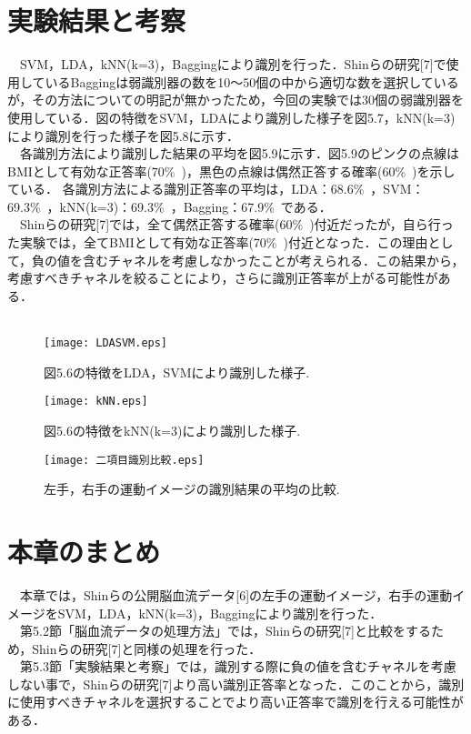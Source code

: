 \documentclass[a4j,12pt]{jreport}
\begin{document}
\section{実験結果と考察}
　SVM，LDA，kNN(k=3)，Baggingにより識別を行った．Shinらの研究[7]で使用しているBaggingは弱識別器の数を10～50個の中から適切な数を選択しているが，その方法についての明記が無かったため，今回の実験では30個の弱識別器を使用している．図の特徴をSVM，LDAにより識別した様子を図5.7，kNN(k=3)により識別を行った様子を図5.8に示す．\\
　各識別方法により識別した結果の平均を図5.9に示す．図5.9のピンクの点線はBMIとして有効な正答率(70\%\ )，黒色の点線は偶然正答する確率(60\%\ )を示している． 各識別方法による識別正答率の平均は，LDA：68.6\%\ ，SVM：69.3\%\ ，kNN(k=3)：69.3\%\ ，Bagging：67.9\%\ である．\\
　Shinらの研究[7]では，全て偶然正答する確率(60\%\ )付近だったが，自ら行った実験では，全てBMIとして有効な正答率(70\%\ )付近となった．この理由として，負の値を含むチャネルを考慮しなかったことが考えられる．この結果から，考慮すべきチャネルを絞ることにより，さらに識別正答率が上がる可能性がある．\\
　
\begin{figure}[t]
  \begin{center}
    \texttt{[image: LDASVM.eps]}
    \caption{図5.6の特徴をLDA，SVMにより識別した様子.}
    \label{fig}
  \end{center}
\end{figure}

\begin{figure}[t]
  \begin{center}
    \texttt{[image: kNN.eps]}
    \caption{図5.6の特徴をkNN(k=3)により識別した様子.}
    \label{fig}
  \end{center}
\end{figure}

\begin{figure}[t]
  \begin{center}
    \texttt{[image: 二項目識別比較.eps]}
    \caption{左手，右手の運動イメージの識別結果の平均の比較.}
    \label{fig}
  \end{center}
\end{figure}

\section{本章のまとめ}
　本章では，Shinらの公開脳血流データ[6]の左手の運動イメージ，右手の運動イメージをSVM，LDA，kNN(k=3)，Baggingにより識別を行った．\\
　第5.2節「脳血流データの処理方法」では，Shinらの研究[7]と比較をするため，Shinらの研究[7]と同様の処理を行った．\\
　第5.3節「実験結果と考察」では，識別する際に負の値を含むチャネルを考慮しない事で，Shinらの研究[7]より高い識別正答率となった．このことから，識別に使用すべきチャネルを選択することでより高い正答率で識別を行える可能性がある．\\
\end{document}
